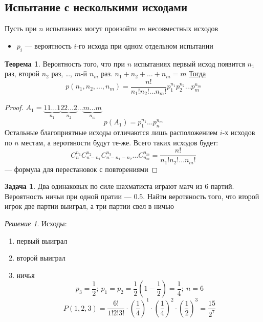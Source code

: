 \documentclass[oneside]{book}
\theoremstyle{plain}
\theoremstyle{remark}
\newtheorem*{solution}{Решение}
\theoremstyle{definition}
\newtheorem{task}{Задача}
\newtheorem{theorem}{Теорема}[section]
\begin{document}
\subsection{Испытание с несколькими исходами}
\label{sec:org5c27ecc}
Пусть при \(n\) испытаниях могут произойти \(m\) несовместных исходов
\begin{itemize}
\item \(p_i\) --- вероятность \(i\)-го исхода при одном отдельном испытании
\end{itemize}
\begin{theorem}
Вероятность того, что при \(n\) испытаниях первый исход появится \(n_1\) раз, второй \(n_2\) раз, \dots{}, \(m\)-й \(n_m\) раз. \(n_1 + n_2 + \dots + n_m = m\)
\uline{Тогда} \[ p(n_1, n_2, \dots, n_m) = \frac{n!}{n_1!n_2!\dots n_m!}p_1^{n_1}p_2^{n_2}\dots p_m^{n_m} \]
\end{theorem}
\begin{proof}
\(A_1 = \underbrace{11\dots1}_{n_1}\underbrace{22\dots2}_{n_2}\dots \underbrace{m\dots m}_{n_m}\)
\[ p(A_1) = p_1^{n_1}\dots p_n^{n_m} \]
Остальные благоприятные исходы отличаются лишь расположением \(i\)-х исходов по \(n\) местам, а веротяности будут те-же. Всего таких исходов будет:
\[ C^{n_1}_nC^{n_2}_{n - n_1}C^{n_3}_{n - n_1 - n_2}\dots C^{n_m}_{n_m} = \frac{n!}{n_1!n_2!\dots n_m!} \] --- формула для перестановок с повторениями
\end{proof}
\begin{task}
Два одинаковых по силе шахматиста играют матч из 6 партий. Вероятность ничьи при одной пратии --- \(0.5\). Найти веротяность того, что второй игрок две партии выиграл, а три партии свел в ничью
\end{task}
\begin{solution}
Исходы:
\begin{enumerate}
\item первый выиграл
\item второй выиграл
\item ничья
\[ p_3 = \frac{1}{2};\ p_1 = p_2 = \frac{1}{2}\left(1 - \frac{1}{2}\right) = \frac{1}{4};\ n= 6 \]
\[ P(1, 2, 3) = \frac{6!}{1!2!3!}\cdot\left(\frac{1}{4}\right)^1\cdot\left(\frac{1}{4}\right)^2\cdot\left(\frac{1}{2}\right)^3  = \frac{15}{2^7}\]
\end{enumerate}
\end{solution}
\end{document}
